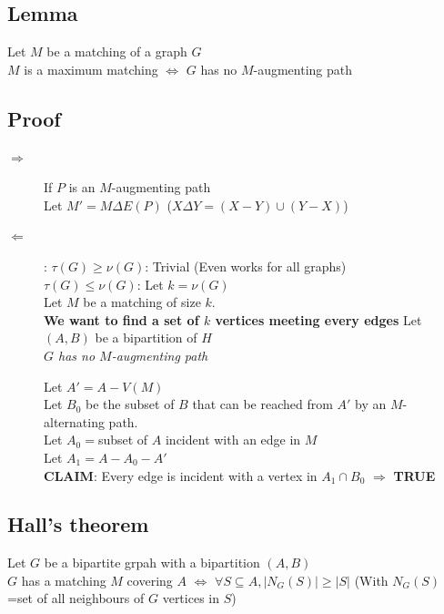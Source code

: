         \subsection{Lemma}
            Let $M$ be a matching of a graph $G$\\
            $M$ is a maximum matching $\Leftrightarrow$ $G$ has no $M$-augmenting path
        \subsection{Proof}
            \begin{description}%
                \item[$\Rightarrow$] If $P$ is an $M$-augmenting path\\
                    Let $M'=M\Delta E(P)$ ($X\Delta Y=(X-Y)\cup(Y-X)$)\\
                \item[$\Leftarrow$]: \textbf{$\tau(G)\geq \nu(G)$}: Trivial (Even works for all graphs)\\
                \textbf{$\tau(G)\leq \nu(G)$}: Let $k=\nu(G)$\\
                        Let $M$ be a matching of size $k$.\\
                        \textbf{We want to find a set of $k$ vertices meeting every edges}
                        Let $(A, B)$ be a bipartition of $H$\\
                        \textit{$G$ has no $M$-augmenting path}

                        Let $A'=A-V(M)$\\
                        Let $B_0$ be the subset of $B$ that can be reached from $A'$ by an $M$-alternating path.\\
                        Let $A_0=$subset of $A$ incident with an edge in $M$\\
                        Let $A_1=A-A_0-A'$\\
                        \textbf{CLAIM}: Every edge is incident with a vertex in $A_1\cap B_0$ $\Rightarrow$ \textbf{TRUE}
            \end{description}
        \subsection{Hall's theorem}
            Let $G$ be a bipartite grpah with a bipartition $(A, B)$\\
            $G$ has a matching $M$ covering $A$ $\Leftrightarrow$ $\forall S \subseteq A, |N_{G}(S)|\geq|S|$ (With $N_{G}(S)$=set of all neighbours of $G$ vertices in $S$)\\
